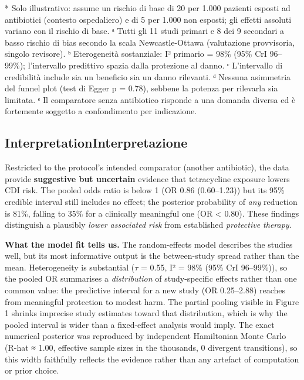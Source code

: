 \documentclass[
  letterpaper,
  DIV=11,
  numbers=noendperiod]{scrartcl}
\begin{document}
* Solo illustrativo: assume un rischio di base di 20 per 1.000 pazienti
esposti ad antibiotici (contesto ospedaliero) e di 5 per 1.000 non
esposti; gli effetti assoluti variano con il rischio di base. ᵃ Tutti
gli 11 studi primari e 8 dei 9 secondari a basso rischio di bias secondo
la scala Newcastle-Ottawa (valutazione provvisoria, singolo revisore). ᵇ
Eterogeneità sostanziale: I² primario = 98\% (95\% CrI 96--99\%);
l'intervallo predittivo spazia dalla protezione al danno. ᶜ L'intervallo
di credibilità include sia un beneficio sia un danno rilevanti. ᵈ
Nessuna asimmetria del funnel plot (test di Egger p = 0.78), sebbene la
potenza per rilevarla sia limitata. ᵉ Il comparatore senza antibiotico
risponde a una domanda diversa ed è fortemente soggetto a confondimento
per indicazione.

\subsection{\texorpdfstring{{Interpretation}{Interpretazione}}{InterpretationInterpretazione}}\label{interpretationinterpretazione}

Restricted to the protocol's intended comparator (another antibiotic),
the data provide \textbf{suggestive but uncertain} evidence that
tetracycline exposure lowers CDI risk. The pooled odds ratio is below 1
(OR 0.86 (0.60--1.23)) but its 95\% credible interval still includes no
effect; the posterior probability of \emph{any} reduction is 81\%,
falling to 35\% for a clinically meaningful one (OR \textless{} 0.80).
These findings distinguish a plausibly \emph{lower associated risk} from
established \emph{protective therapy}.

\textbf{What the model fit tells us.} The random-effects model describes
the studies well, but its most informative output is the between-study
spread rather than the mean. Heterogeneity is substantial (\(\tau\) =
0.55, I² = 98\% (95\% CrI 96--99\%)), so the pooled OR summarises a
\emph{distribution} of study-specific effects rather than one common
value: the predictive interval for a new study (OR 0.25--2.88) reaches
from meaningful protection to modest harm. The partial pooling visible
in Figure 1 shrinks imprecise study estimates toward that distribution,
which is why the pooled interval is wider than a fixed-effect analysis
would imply. The exact numerical posterior was reproduced by independent
Hamiltonian Monte Carlo (R-hat ≈ 1.00, effective sample sizes in the
thousands, 0 divergent transitions), so this width faithfully reflects
the evidence rather than any artefact of computation or prior choice.
\end{document}
